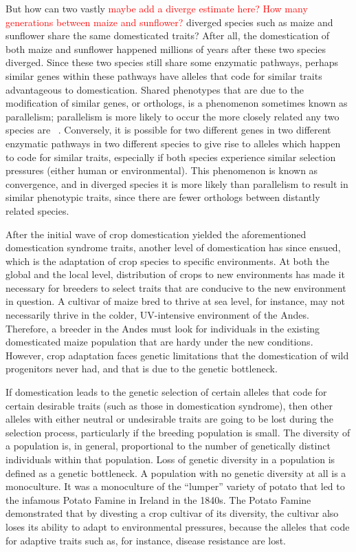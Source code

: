 \documentclass[12pt]{article}
\newcommand{\mbh}[1]{\textcolor{red}{\normalsize  #1}}
\begin{document}
But how can two vastly \mbh{maybe add a diverge estimate here?  How many generations between maize and sunflower?} diverged species such as maize and sunflower share the same domesticated traits? 
After all, the domestication of both maize and sunflower happened millions of years after these two species diverged. Since these two species still share some enzymatic pathways, perhaps similar genes within these pathways have alleles that code for similar traits advantageous to domestication. Shared phenotypes that are due to the modification of similar genes, or orthologs, is a phenomenon sometimes known as parallelism; parallelism is more likely to occur the more closely related any two species are ~\citep{Pickersgill2018}. Conversely, it is possible for two different genes in two different enzymatic pathways in two different species to give rise to alleles which happen to code for similar traits, especially if both species experience similar selection pressures (either human or environmental). This phenomenon is known as convergence, and in diverged species it is more likely than parallelism to result in similar phenotypic traits, since there are fewer orthologs between distantly related species.

After the initial wave of crop domestication yielded the aforementioned domestication syndrome traits, another level of domestication has since ensued, which is the adaptation of crop species to specific environments.  At both the global and the local level, distribution of crops to new environments has made it necessary for breeders to select traits that are conducive to the new environment in question. A cultivar of maize bred to thrive at sea level, for instance, may not necessarily thrive in the colder, UV-intensive environment of the Andes.  Therefore, a breeder in the Andes must look for individuals in the existing domesticated maize population that are hardy under the new conditions. However, crop adaptation faces genetic limitations that the domestication of wild progenitors never had, and that is due to the genetic bottleneck. 

If domestication leads to the genetic selection of certain alleles that code for certain desirable traits (such as those in domestication syndrome), then other alleles with either neutral or undesirable traits are going to be lost during the selection process, particularly if the breeding population is small. The diversity of a population is, in general, proportional to the number of genetically distinct individuals within that population. Loss of genetic diversity in a population is defined as a genetic bottleneck. A population with no genetic diversity at all is a monoculture. It was a monoculture of the “lumper” variety of potato that led to the infamous Potato Famine in Ireland in the 1840s.  The Potato Famine demonstrated that by divesting a crop cultivar of its diversity, the cultivar also loses its ability to adapt to environmental pressures, because the alleles that code for adaptive traits such as, for instance, disease resistance are lost.  
\end{document}

